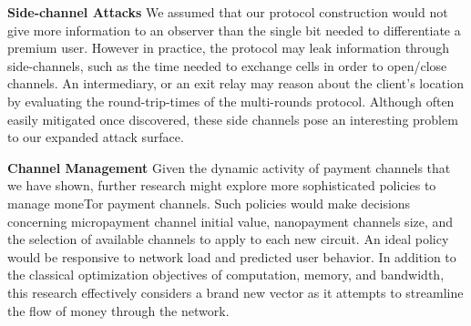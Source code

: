 \textbf{Side-channel Attacks} We assumed that our protocol construction would
not give more information to an observer than the single bit needed to
differentiate a premium user. However in practice, the protocol may leak
information through side-channels, such as the time needed to exchange cells in
order to open/close channels. An intermediary, or an exit relay may reason about
the client's location by evaluating the round-trip-times of the multi-rounds
protocol. Although often easily mitigated once discovered, these side channels
pose an interesting problem to our expanded attack surface.

\textbf{Channel Management} Given the dynamic activity of payment channels that
we have shown, further research might explore more sophisticated policies to
manage moneTor payment channels. Such policies would make decisions concerning
micropayment channel initial value, nanopayment channels size, and the selection
of available channels to apply to each new circuit. An ideal policy would be
responsive to network load and predicted user behavior. In addition to the
classical optimization objectives of computation, memory, and bandwidth, this
research effectively considers a brand new vector as it attempts to streamline
the flow of money through the network.

